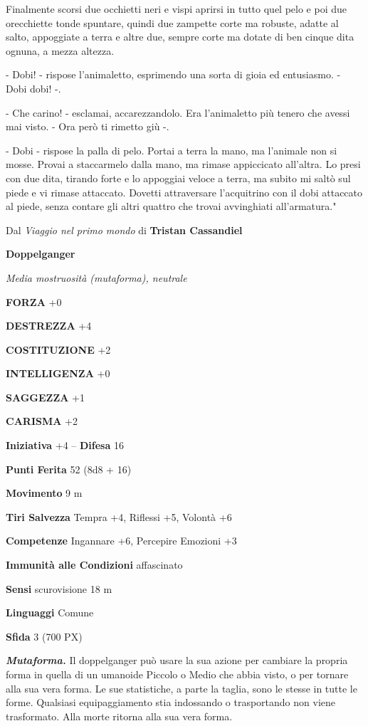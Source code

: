 \begin{multicols}{2}
{Finalmente scorsi due occhietti neri e vispi aprirsi in tutto quel pelo e poi due orecchiette tonde spuntare, quindi due zampette corte ma robuste, adatte al salto, appoggiate a terra e altre due, sempre corte ma dotate di ben cinque dita ognuna, a mezza altezza.

- Dobi! - rispose l’animaletto, esprimendo una sorta di gioia ed entusiasmo. - Dobi dobi! -.

- Che carino! - esclamai, accarezzandolo. Era l’animaletto più tenero che avessi mai visto. - Ora però ti rimetto giù -.

- Dobi - rispose la palla di pelo.
Portai a terra la mano, ma l'animale non si mosse. Provai a staccarmelo dalla mano, ma rimase appiccicato all'altra. Lo presi con due dita, tirando forte e lo appoggiai veloce a terra, ma subito mi saltò sul piede e vi rimase attaccato. Dovetti attraversare l'acquitrino con il dobi attaccato al piede, senza contare gli altri quattro che trovai avvinghiati all'armatura."

Dal \textit{Viaggio nel primo mondo} di \textbf{Tristan Cassandiel}}


\medskip{}\textbf{Doppelganger}

\textit{Media mostruosità (mutaforma), neutrale}

\textbf{FORZA} +0

\textbf{DESTREZZA} +4

\textbf{COSTITUZIONE} +2

\textbf{INTELLIGENZA} +0

\textbf{SAGGEZZA} +1

\textbf{CARISMA} +2

\textbf{Iniziativa} +4 -- \textbf{Difesa} 16

\textbf{Punti Ferita} 52 (8d8 + 16)

\textbf{Movimento} 9 m

\textbf{Tiri Salvezza} Tempra +4, Riflessi +5, Volontà +6

\textbf{Competenze} Ingannare +6, Percepire Emozioni +3

\textbf{Immunità alle Condizioni} affascinato

\textbf{Sensi} scurovisione 18 m

\textbf{Linguaggi} Comune

\textbf{Sfida} 3 (700 PX)

\textit{\textbf{Mutaforma.}} Il doppelganger può usare la sua azione per cambiare la propria forma in quella di un umanoide Piccolo o Medio che abbia visto, o per tornare alla sua vera forma. Le sue statistiche, a parte la taglia, sono le stesse in tutte le forme. Qualsiasi equipaggiamento stia indossando o trasportando non viene trasformato. Alla morte ritorna alla sua vera forma.


\end{multicols}
